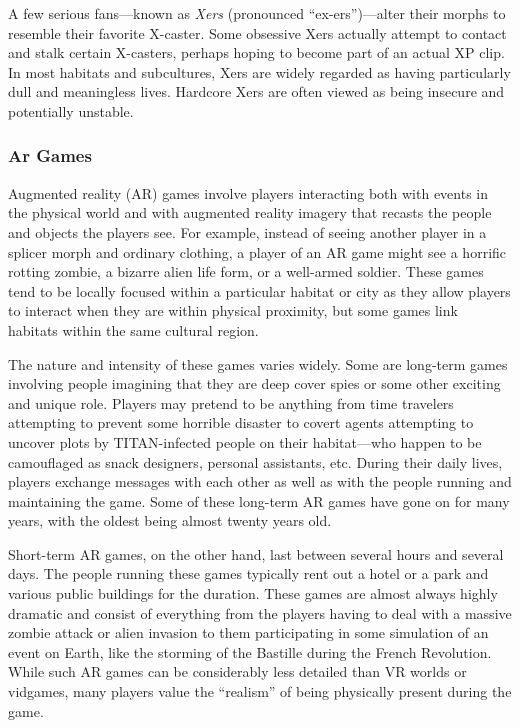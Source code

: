 A few serious fans—known as \textit{Xers} (pronounced 
``ex-ers'')—alter their morphs to resemble their favorite
X-caster. Some obsessive Xers actually attempt to
contact and stalk certain X-casters, perhaps hoping 
to become part of an actual XP clip. In most habitats 
and subcultures, Xers are widely regarded as having 
particularly dull and meaningless lives. Hardcore 
Xers are often viewed as being insecure and potentially
unstable.

\subsubsection{Ar Games}

Augmented reality (AR) games involve players 
interacting both with events in the physical world 
and with augmented reality imagery that recasts the 
people and objects the players see. For example, instead
of seeing another player in a splicer morph and
ordinary clothing, a player of an AR game might see 
a horrific rotting zombie, a bizarre alien life form, or 
a well-armed soldier. These games tend to be locally 
focused within a particular habitat or city as they 
allow players to interact when they are within physical
proximity, but some games link habitats within
the same cultural region.

The nature and intensity of these games varies 
widely. Some are long-term games involving people 
imagining that they are deep cover spies or some other 
exciting and unique role. Players may pretend to be 
anything from time travelers attempting to prevent 
some horrible disaster to covert agents attempting 
to uncover plots by TITAN-infected people on their 
habitat—who happen to be camouflaged as snack 
designers, personal assistants, etc. During their daily 
lives, players exchange messages with each other as 
well as with the people running and maintaining 
the game. Some of these long-term AR games have 
gone on for many years, with the oldest being almost 
twenty years old.

Short-term AR games, on the other hand, last between
several hours and several days. The people running
these games typically rent out a hotel or a park
and various public buildings for the duration. These 
games are almost always highly dramatic and consist 
of everything from the players having to deal with 
a massive zombie attack or alien invasion to them 
participating in some simulation of an event on Earth, 
like the storming of the Bastille during the French 
Revolution. While such AR games can be considerably
less detailed than VR worlds or vidgames, many
players value the ``realism'' of being physically present 
during the game.

